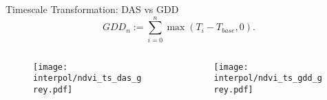 \begin{frame}{Timescale Transformation: DAS vs GDD}
	\begin{equation}
		GDD_n := \sum_{i=0}^n \max(T_i - T_{base}, 0).
	\end{equation}

	\begin{columns}
		
		\begin{column}{0.48\textwidth}
			\begin{figure}
				\texttt{[image: interpol/ndvi\_ts\_das\_grey.pdf]}
			\end{figure}
		\end{column}
		\begin{column}{0.48\textwidth}
			\begin{figure}
				\texttt{[image: interpol/ndvi\_ts\_gdd\_grey.pdf]}
			\end{figure}
		\end{column}
		
	\end{columns}
\end{frame}


